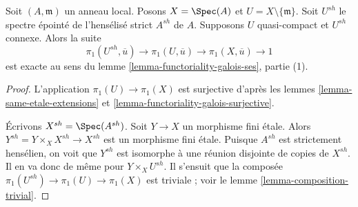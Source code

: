 \begin{lemma}
\label{lemma-local-exact-sequence}
Soit $(A, \mathfrak m)$ un anneau local. Posons $X = \Spec(A)$ et
$U = X \setminus \{\mathfrak m\}$. Soit $U^{sh}$ le spectre épointé
de l'hensélisé strict $A^{sh}$ de $A$.
Supposons $U$ quasi-compact et $U^{sh}$ connexe. Alors la suite
$$
\pi_1(U^{sh}, \overline{u}) \to \pi_1(U, \overline{u}) \to
\pi_1(X, \overline{u}) \to 1
$$
est exacte au sens du lemme \ref{lemma-functoriality-galois-ses}, partie (1).
\end{lemma}

\begin{proof}
L'application $\pi_1(U) \to \pi_1(X)$ est surjective d'après les
lemmes \ref{lemma-same-etale-extensions} et
\ref{lemma-functoriality-galois-surjective}.

\medskip\noindent
Écrivons $X^{sh} = \Spec(A^{sh})$. Soit $Y \to X$ un morphisme fini étale.
Alors $Y^{sh} = Y \times_X X^{sh} \to X^{sh}$ est un morphisme fini étale.
Puisque $A^{sh}$ est strictement hensélien, on voit que $Y^{sh}$ est isomorphe
à une réunion disjointe de copies de $X^{sh}$. Il en va donc de même pour
$Y \times_X U^{sh}$. Il s'ensuit que la composée
$\pi_1(U^{sh}) \to \pi_1(U) \to \pi_1(X)$ est triviale ; voir
le lemme \ref{lemma-composition-trivial}.


\end{proof}
